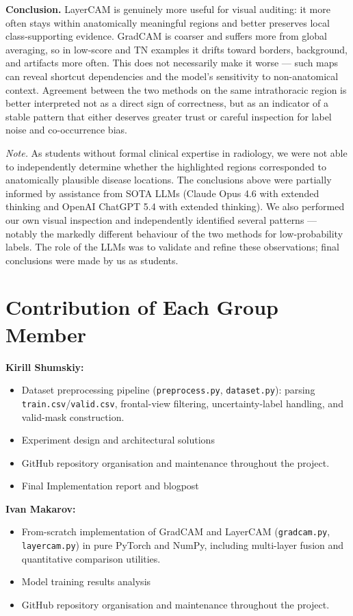 \documentclass[12pt]{article}
\begin{document}
\smallskip
\textbf{Conclusion.}
LayerCAM is genuinely more useful for visual auditing: it more often stays within anatomically meaningful regions and better preserves local class-supporting evidence.
GradCAM is coarser and suffers more from global averaging, so in low-score and TN examples it drifts toward borders, background, and artifacts more often.
This does not necessarily make it worse --- such maps can reveal shortcut dependencies and the model's sensitivity to non-anatomical context.
Agreement between the two methods on the same intrathoracic region is better interpreted not as a direct sign of correctness, but as an indicator of a stable pattern that either deserves greater trust or careful inspection for label noise and co-occurrence bias.

\smallskip
\textit{Note.}
As students without formal clinical expertise in radiology, we were not able to independently determine whether the highlighted regions corresponded to anatomically plausible disease locations. 
The conclusions above were partially informed by assistance from SOTA LLMs (Claude Opus 4.6 with extended thinking and OpenAI ChatGPT 5.4 with extended thinking). We also performed our own visual inspection and independently identified several patterns — notably the markedly different behaviour of the two methods for low-probability labels. 
The role of the LLMs was to validate and refine these observations; final conclusions were made by us as students.

\section{Contribution of Each Group Member}

\textbf{Kirill Shumskiy:}
\begin{itemize}[leftmargin=*]
    \item Dataset preprocessing pipeline (\texttt{preprocess.py}, \texttt{dataset.py}): parsing \texttt{train.csv}/\texttt{valid.csv}, frontal-view filtering, uncertainty-label handling, and valid-mask construction.
    \item Experiment design and architectural solutions
    \item GitHub repository organisation and maintenance throughout the project.
    \item Final Implementation report and blogpost
\end{itemize}

\textbf{Ivan Makarov:}
\begin{itemize}[leftmargin=*]
    \item From-scratch implementation of GradCAM and LayerCAM (\texttt{gradcam.py}, \texttt{layercam.py}) in pure PyTorch and NumPy, including multi-layer fusion and quantitative comparison utilities.
    \item Model training results analysis
    \item GitHub repository organisation and maintenance throughout the project.
\end{itemize}
\end{document}
